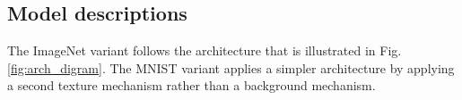 \subsection{Model descriptions}

The ImageNet variant follows the architecture that is illustrated in Fig. \ref{fig:arch_digram}. The MNIST variant applies a simpler architecture by applying a second texture mechanism rather than a background mechanism.


